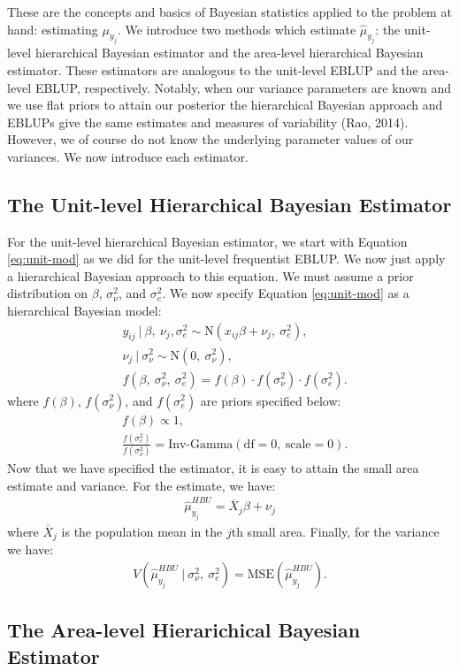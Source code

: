 \documentclass[12pt,twoside]{reedthesis}
\begin{document}
These are the concepts and basics of Bayesian statistics applied to the problem at hand: estimating \(\mu_{y_j}\). We introduce two methods which estimate \(\hat\mu_{y_j}\): the unit-level hierarchical Bayesian estimator and the area-level hierarchical Bayesian estimator. These estimators are analogous to the unit-level EBLUP and the area-level EBLUP, respectively. Notably, when our variance parameters are known and we use flat priors to attain our posterior the hierarchical Bayesian approach and EBLUPs give the same estimates and measures of variability (Rao, 2014). However, we of course do not know the underlying parameter values of our variances. We now introduce each estimator.

\hypertarget{the-unit-level-hierarchical-bayesian-estimator}{%
\subsection{The Unit-level Hierarchical Bayesian Estimator}\label{the-unit-level-hierarchical-bayesian-estimator}}

For the unit-level hierarchical Bayesian estimator, we start with Equation \eqref{eq:unit-mod} as we did for the unit-level frequentist EBLUP. We now just apply a hierarchical Bayesian approach to this equation. We must assume a prior distribution on \(\beta\), \(\sigma^2_\nu\), and \(\sigma^2_e\). We now specify Equation \eqref{eq:unit-mod} as a hierarchical Bayesian model:
\begin{align}
&y_{ij} ~\vert~ \beta,~ \nu_j, \sigma^2_e \sim \text{N}(x_{ij}\beta + \nu_j,~ \sigma^2_e), \nonumber \\
&\nu_j ~\vert~ \sigma^2_\nu \sim \text{N}(0,~ \sigma^2_\nu),\nonumber \\
&f(\beta,~ \sigma^2_\nu, ~\sigma^2_e) = f(\beta)\cdot f(\sigma^2_\nu) \cdot f(\sigma^2_e).
\end{align}
where \(f(\beta)\), \(f(\sigma^2_\nu)\), and \(f(\sigma^2_e)\) are priors specified below:
\begin{align*}
&f(\beta) \propto 1, \\
&\frac{f(\sigma^2_e)}{f(\sigma^2_\nu)} = \text{Inv-Gamma}(\text{df} = 0,~ \text{scale} = 0).
\end{align*}
Now that we have specified the estimator, it is easy to attain the small area estimate and variance. For the estimate, we have:
\begin{align}
\hat\mu_{y_j}^{HBU} = \overline X_j \beta + \nu_j
\end{align}
where \(\overline X_j\) is the population mean in the \(j\)th small area. Finally, for the variance we have:
\begin{align}
V(\hat \mu_{y_j}^{HBU} ~\vert~ \sigma^2_\nu,~ \sigma^2_e) = \text{MSE}(\hat\mu_{y_j}^{HBU}).
\end{align}
\hypertarget{the-area-level-hierarichical-bayesian-estimator}{%
\subsection{The Area-level Hierarichical Bayesian Estimator}\label{the-area-level-hierarichical-bayesian-estimator}}
\end{document}
